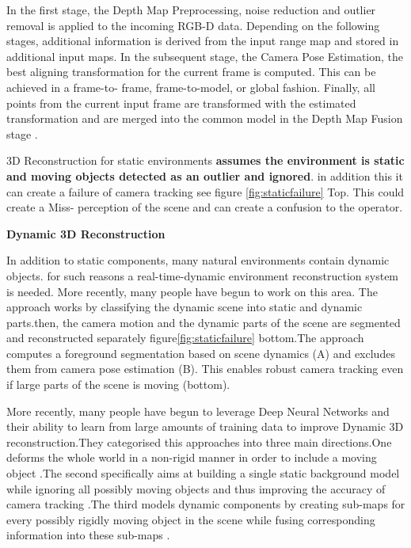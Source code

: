In the first stage, the Depth Map Preprocessing, noise reduction and outlier removal is applied to the incoming RGB-D data. Depending on the following stages, additional information is derived from the input range map and stored in additional input maps. In the subsequent stage, the Camera Pose Estimation, the best aligning transformation for the current frame is computed. This can be achieved in a frame-to- frame, frame-to-model, or global fashion. Finally, all points from the current input frame are transformed with the estimated transformation and are merged into the common model in the Depth Map Fusion stage \cite{Zollhofer2018}.

3D Reconstruction for static environments \textbf{assumes the environment is static and moving objects detected as an outlier and ignored}. in addition this it can create a failure of camera tracking see figure \ref{fig:staticfailure} Top. This could create a Miss- perception of the scene and can create a confusion to the operator.

\textbf{Dynamic 3D Reconstruction}

In addition to static components, many natural environments contain dynamic objects. for such reasons a real-time-dynamic environment reconstruction system is needed. More recently, many people have begun to work on this area. The approach works by classifying the dynamic scene into static and dynamic parts.then, the camera motion and the dynamic parts of the scene are segmented and reconstructed separately figure\ref{fig:staticfailure} bottom.The approach \cite{Keller:2013:RRD:2544744.2544784} computes a foreground segmentation based on scene dynamics (A) and excludes them from camera pose estimation (B). This enables robust camera tracking even if large parts of the scene is moving (bottom). 

More recently, many people have begun to leverage Deep Neural Networks and their ability to learn from large amounts of training data to improve Dynamic 3D reconstruction.They categorised this approaches into three main directions.One deforms the whole world in a non-rigid manner in order to include a moving object \cite{newcombe2015dynamicfusion}.The second specifically aims at building a single static background model while ignoring all possibly moving objects and thus improving the accuracy of camera tracking \cite{jaimez2017fast} \cite{scona2018staticfusion} \cite{barnes2018driven}\cite{bescos2018dynaslam}.The third models dynamic components by creating sub-maps for every possibly rigidly moving object in the scene while fusing corresponding information into these sub-maps \cite{runz2017co} \cite{barsan2018robust}\cite{runz2018maskfusion} \cite{xu2019mid} \cite{narita2019panopticfusion} \cite{ miksik2019live} \cite{strecke2019fusion} \cite{hachiuma2019detectfusion}.

